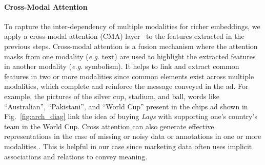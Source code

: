 \paragraph{Cross-Modal Attention} 
To capture the inter-dependency of multiple modalities for richer embeddings, we apply a cross-modal attention (CMA) layer~\cite{frank2021vision} to the features extracted in the previous steps. Cross-modal attention is a fusion mechanism where the attention masks from one modality (\textit{e.g.} text) are used to highlight the extracted features in another modality (\textit{e.g.} symbolism). It helps to link and extract common features in two or more modalities since common elements exist across multiple modalities, which complete and reinforce the message conveyed in the ad. For example, the pictures of the silver cup, stadium, and ball, words like ``Australian'', ``Pakistani'', and ``World Cup'' present in the chips ad shown in Fig.~\ref{fig:arch_diag} link the idea of buying \textit{Lays} with supporting one's country's team in the World Cup. Cross attention can also generate effective representations in the case of missing or noisy data or annotations in one or more modalities \cite{frank2021vision}. This is helpful in our case since marketing data often uses implicit associations and relations to convey meaning. 


